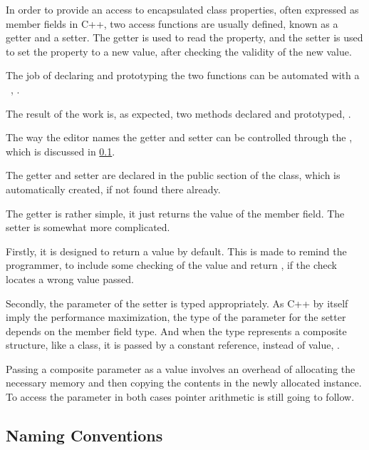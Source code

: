 In order to provide an access to encapsulated class properties, often expressed as member fields in C++, 
two access functions are usually defined, known as a getter and a setter. The getter is used to read the property,
and the setter is used to set the property to a new value, after checking the validity of the new value.

The job of declaring and prototyping the two functions can be automated with a \jbmps\ , .


The result of the  work is, as expected, two methods declared and prototyped, .


The way the editor names the getter and setter can be controlled through the  , which
is discussed in \ref{namingconventions}.

The getter and setter are declared in the public section of the class, which is automatically created, if
not found there already.

The getter is rather simple, it just returns the value of the member field.
The setter is somewhat more complicated. 

Firstly, it is designed to return a  value by default. This is made
to remind the programmer, to include some checking of the value and return , if the check locates a wrong value passed. 

Secondly, the parameter of the setter is typed appropriately. As C++ by itself imply the performance maximization, the type
of the parameter for the setter depends on the member field type. And when the type represents a composite
structure, like a class, it is passed by a constant reference, instead of value, .


Passing a composite parameter as a value involves an overhead of allocating the necessary memory and 
then copying the contents in the newly allocated instance. To access the parameter in both cases pointer
arithmetic is still going to follow.

\subsection{Naming Conventions}
\label{namingconventions}


